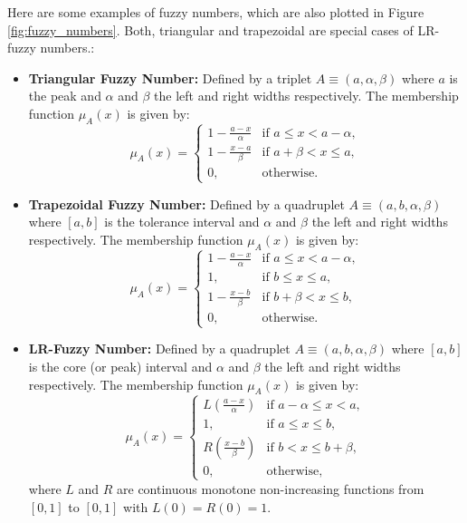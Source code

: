 \begin{example}\label{ex:fuzzy_num}
    Here are some examples of fuzzy numbers, which are also plotted in Figure \ref{fig:fuzzy_numbers}. Both, triangular and trapezoidal are special cases of LR-fuzzy numbers.:
    \begin{itemize}
        \item \textbf{Triangular Fuzzy Number:} Defined by a triplet $A\equiv(a, \alpha, \beta)$ where $a$ is the peak and $\alpha$ and $\beta$ the left and right widths respectively. The membership function $\mu_A(x)$ is given by:
        \[
        \mu_A(x) = 
        \begin{cases} 
        1-\frac{a-x}{\alpha} & \text{if } a \leq x < a-\alpha, \\
        1-\frac{x-a}{\beta} & \text{if } a+\beta < x \leq a, \\
        0, & \text{otherwise.}
        \end{cases}
        \]
        
        \item \textbf{Trapezoidal Fuzzy Number:} Defined by a quadruplet $A\equiv(a, b, \alpha, \beta)$ where $[a,b]$ is the tolerance interval and $\alpha$ and $\beta$ the left and right widths respectively. The membership function $\mu_A(x)$ is given by:
        \[
        \mu_A(x) = 
        \begin{cases} 
        1-\frac{a-x}{\alpha} & \text{if } a \leq x < a-\alpha, \\
        1, & \text{if } b \leq x \leq a, \\
        1-\frac{x-b}{\beta} & \text{if } b+\beta < x \leq b, \\
        0, & \text{otherwise.}
        \end{cases}
        \]
        
        \item \textbf{LR-Fuzzy Number:} Defined by a quadruplet $A\equiv(a, b, \alpha, \beta)$ where $[a,b]$ is the core (or peak) interval and $\alpha$ and $\beta$ the left and right widths respectively. The membership function $\mu_A(x)$ is given by:
        \[
        \mu_A(x) = 
        \begin{cases} 
        L\left(\frac{a-x}{\alpha}\right) & \text{if } a-\alpha \leq x < a, \\
        1, & \text{if } a \leq x \leq b, \\
        R\left(\frac{x-b}{\beta}\right) & \text{if } b < x \leq b+\beta, \\
        0, & \text{otherwise,}
        \end{cases}
        \]
        where $L$ and $R$ are continuous monotone non-increasing functions from $[0,1]$ to $[0,1]$ with $L(0)=R(0)=1$.
    \end{itemize}
\end{example}
    
